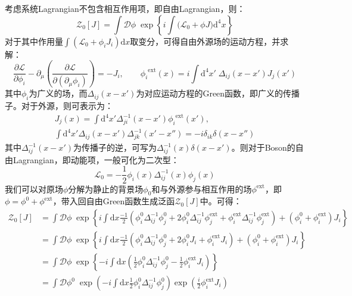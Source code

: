 考虑系统Lagrangian不包含相互作用项，即自由Lagrangian，则：
\begin{equation}
\mathcal{Z}_0[J]=\int\mathcal{D}\phi\;\exp\left\lbrace i\int\Big(\mathscr{L}_0+\phi J\Big)\mathrm{d}^4 x\right\rbrace 
\end{equation}
对于其中作用量$\displaystyle{\int}(\mathscr{L}_0+\phi_i J_i)\mathrm{d}x$取变分，可得自由外源场的运动方程，并求解：
\begin{equation}
\frac{\partial\mathscr{L}}{\partial\phi_i}-\partial_\mu\left(\frac{\partial\mathscr{L}}{\partial(\partial_\mu\phi_i)}\right)=-J_i,\qquad {\phi_i}^{\text{ext}}(x)=i\int\mathrm{d}^4x'\;\Delta_{ij}(x-x')J_j(x')
\end{equation}
其中$\phi_i$为广义的场，而$\Delta_{ij}(x-x')$为对应运动方程的Green函数，即广义的传播子。对于外源，则可表示为：
\begin{gather}
J_j(x)=\int\mathrm{d}^4x'\Delta^{-1}_{ji}(x-x'){\phi_i}^{\text{ext}}(x'),\\
\int\mathrm{d}^4x'\Delta_{ij}(x-x')\Delta^{-1}_{jk}(x'-x'')=-i\delta_{ik}\delta(x-x'')
\end{gather}
其中$\Delta^{-1}_{ij}(x-x')$为传播子的逆，可写为$\Delta^{-1}_{ij}(x)\delta(x-x')$。则对于Boson的自由Lagrangian，即动能项，一般可化为二次型：
\begin{equation}
\mathscr{L}_0=-\frac{1}{2}\phi_i(x)\Delta^{-1}_{ij}(x)\phi_j(x)
\end{equation}
我们可以对原场$\phi$分解为静止的背景场$\phi_0$和与外源参与相互作用的场$\phi^{\text{ext}}$，即$\phi=\phi^0+\phi^{\text{ext}}$，带入回自由Green函数生成泛函$\mathcal{Z}_0[J]$中。可得：
\begin{equation}
    \begin{split}
     	\mathcal{Z}_0[J]&=\int\mathcal{D}\phi\;\exp\left\lbrace i\int\mathrm{d}x\frac{-1}{2}(\phi^0_i\Delta^{-1}_{ij}\phi^0_j+2\phi^0_i\Delta^{-1}_{ij}\phi^{\text{ext}}_j+\phi^{\text{ext}}_i\Delta^{-1}_{ij}\phi^{\text{ext}}_j)+(\phi^0_i+\phi_i^{\text{ext}})J_i\right\rbrace\\
	&=\int\mathcal{D}\phi\;\exp\left\lbrace i\int\mathrm{d}x\frac{-1}{2}(\phi^0_i\Delta^{-1}_{ij}\phi^0_j+2\phi^0_iJ_i+\phi^{\text{ext}}_iJ_i)+(\phi^0_i+\phi_i^{\text{ext}})J_i\right\rbrace\\
	&=\int\mathcal{D}\phi\;\exp\left\lbrace -i\int\mathrm{d}x\left(\frac{1}{2}\phi^0_i\Delta^{-1}_{ij}\phi^0_j-\frac{1}{2}\phi_i^{\text{ext}}J_i\right)\right\rbrace\\
	&=\int\mathcal{D}\phi^0\;\exp\left( -i\int\mathrm{d}x\frac{1}{2}\phi^0_i\Delta^{-1}_{ij}\phi^0_j\right)\exp\left(\frac{i}{2}\phi_i^{\text{ext}}J_i\right)   
    \end{split}
\end{equation}
